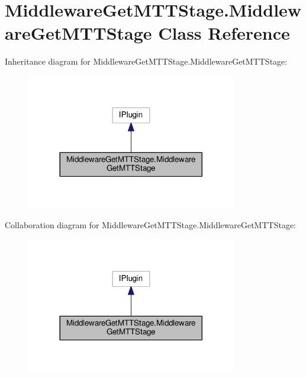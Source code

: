 \hypertarget{class_middleware_get_m_t_t_stage_1_1_middleware_get_m_t_t_stage}{\section{Middleware\-Get\-M\-T\-T\-Stage.\-Middleware\-Get\-M\-T\-T\-Stage Class Reference}
\label{class_middleware_get_m_t_t_stage_1_1_middleware_get_m_t_t_stage}
}


Inheritance diagram for Middleware\-Get\-M\-T\-T\-Stage.\-Middleware\-Get\-M\-T\-T\-Stage\-:
\nopagebreak
\begin{figure}[H]
\begin{center}
\leavevmode
\includegraphics[width=260pt]{class_middleware_get_m_t_t_stage_1_1_middleware_get_m_t_t_stage__inherit__graph}
\end{center}
\end{figure}


Collaboration diagram for Middleware\-Get\-M\-T\-T\-Stage.\-Middleware\-Get\-M\-T\-T\-Stage\-:
\nopagebreak
\begin{figure}[H]
\begin{center}
\leavevmode
\includegraphics[width=260pt]{class_middleware_get_m_t_t_stage_1_1_middleware_get_m_t_t_stage__coll__graph}
\end{center}
\end{figure}

